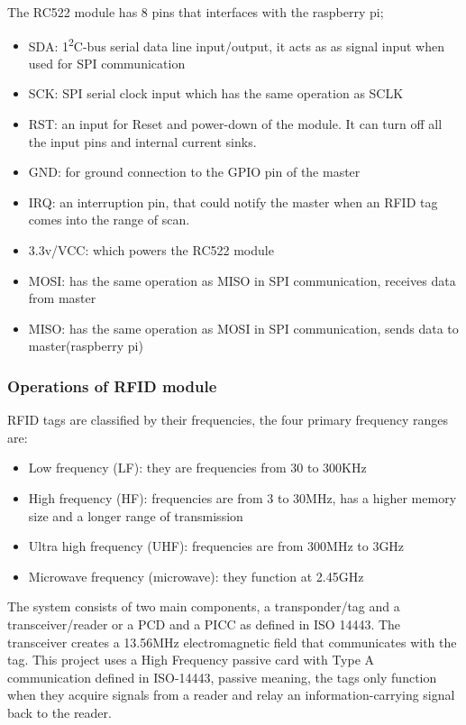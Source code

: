 The RC522 module has 8 pins that interfaces with the raspberry pi;
\begin{itemize}
  \item SDA: 1\textsuperscript{2}C-bus serial data line input/output, it acts as as signal input when used for SPI communication
  \item SCK: SPI serial clock input which has the same operation as SCLK
  \item RST: an input for Reset and power-down of the module. It can turn off all the input pins and internal current sinks. 
  \item GND: for ground connection to the GPIO pin of the master
  \item IRQ: an interruption pin, that could notify the master when an RFID tag comes into the range of scan.
  \item 3.3v/VCC: which powers the RC522 module
  \item MOSI: has the same operation as MISO in SPI communication, receives data from master
  \item MISO: has the same operation as MOSI in SPI communication, sends data to master(raspberry pi)
\end{itemize}

\subsubsection{Operations of RFID module}
RFID tags are classified by their frequencies, the four primary frequency ranges are:
\begin{itemize}
  \item Low frequency (LF): they are frequencies from 30 to 300KHz
  \item High frequency (HF): frequencies are from 3 to 30MHz, has a higher memory size and a longer range of transmission
  \item Ultra high frequency (UHF): frequencies are from 300MHz to 3GHz
  \item Microwave frequency (microwave): they function at 2.45GHz 
\end{itemize}


The system consists of two main components, a transponder/tag and a transceiver/reader or a PCD and a PICC as defined in ISO 14443. The transceiver creates a 13.56MHz electromagnetic field that communicates with the tag. 
This project uses a High Frequency passive card with Type A communication defined in ISO-14443, passive meaning, the tags only function when they acquire signals from a reader and relay an information-carrying signal back to the reader. 




